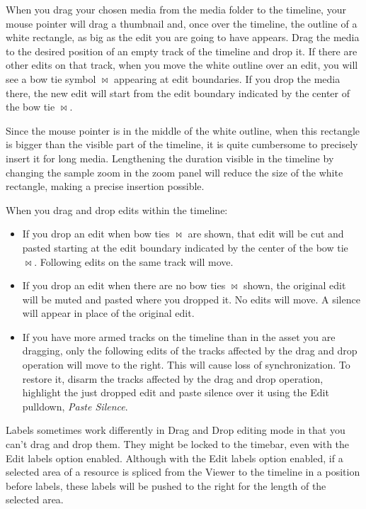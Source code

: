 When you drag your chosen media from the media folder to the
timeline, your mouse pointer will drag a thumbnail and, once over
the timeline, the outline of a white rectangle, as big as the edit
you are going to have appears.  Drag the media to the desired
position of an empty track of the timeline and drop it.  If there
are other edits on that track, when you move the white outline over
an edit, you will see a bow tie symbol $\bowtie$ appearing at edit
boundaries. If you drop the media there, the new edit will start
from the edit boundary indicated by the center of the bow tie
$\bowtie$.

Since the mouse pointer is in the middle of the white outline, when
this rectangle is bigger than the visible part of the timeline, it
is quite cumbersome to precisely insert it for long
media. Lengthening the duration visible in the timeline by changing
the sample zoom in the zoom panel will reduce the size of the white
rectangle, making a precise insertion possible.

When you drag and drop edits within the timeline:

\begin{itemize}
\item If you drop an edit when bow ties $\bowtie$ are shown,
  that edit will be cut and pasted starting at the edit boundary
  indicated by the center of the bow tie $\bowtie$.  Following edits
  on the same track will move.
\item If you drop an edit when there are no bow ties $\bowtie$
  shown, the original edit will be muted and pasted where you dropped
  it. No edits will move. A silence will appear in place of the
  original edit.
\item If you have more armed tracks on the timeline than in the
  asset you are dragging, only the following edits of the tracks
  affected by the drag and drop operation will move to the right. This
  will cause loss of synchronization. To restore it, disarm the tracks
  affected by the drag and drop operation, highlight the just dropped
  edit and paste silence over it using the Edit pulldown,
  \textit{Paste Silence}.
\end{itemize}

Labels sometimes work differently in Drag and Drop editing mode in
that you can't drag and drop them. They might be locked to the
timebar, even with the Edit labels option enabled.  Although with
the Edit labels option enabled, if a selected area of a resource is
spliced from the Viewer to the timeline in a position before labels,
these labels will be pushed to the right for the length of the
selected area.

